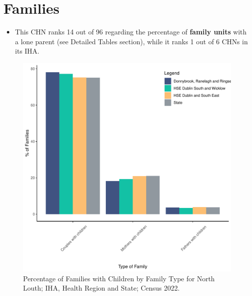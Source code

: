 \documentclass{article}
\begin{document}
\section{Families}\label{sect:Fam}
\begin{itemize}
\item This CHN ranks  14 out of 96 regarding the percentage of \textbf{family units} with a lone parent (see Detailed Tables section), while it ranks   1 out of 6 CHNs in its IHA.
\end{itemize}
\begin{figure}[H]
	\centering
	\includegraphics[width = 150mm]{../figures/FamED.pdf}
	\caption{Percentage of Families with Children by Family Type for North Louth; IHA, Health Region and State; Census 2022.}
	\label{fig:vbnv}
	\end{figure}
	
\end{document}
